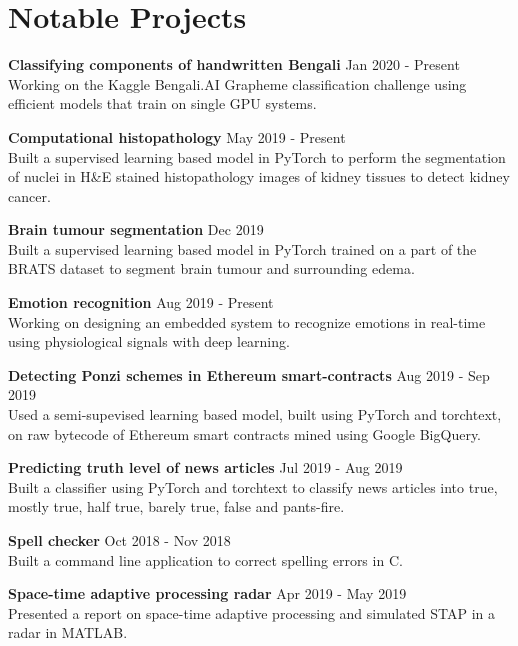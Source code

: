 \documentclass[letterpaper]{article}
\renewenvironment{itemize}{
  \begin{list}{}{
    \setlength{\leftmargin}{1.5em}
  }
}{
  \end{list}
}
\newcommand{\datefont}[1]{\textcolor{black!80}{\small{#1}}}
\begin{document}
\section*{Notable Projects}
  \begin{itemize}
    \item
    \textbf{Classifying components of handwritten Bengali}
    \hfill{\datefont{Jan 2020 - Present}}\\
    Working on the Kaggle Bengali.AI Grapheme classification challenge
    using efficient models that train on single GPU systems.

    \item
    \textbf{Computational histopathology}
    \hfill{\datefont{May 2019 - Present}}\\
    Built a supervised learning based model in PyTorch to perform the segmentation of nuclei in H\&E stained histopathology images of kidney tissues to detect kidney cancer.

    \item
    \textbf{Brain tumour segmentation}
    \hfill{\datefont{Dec 2019}}\\
    Built a supervised learning based model in PyTorch trained on a part of the BRATS dataset to segment brain tumour and surrounding edema.

    \item
    \textbf{Emotion recognition}
    \hfill{\datefont{Aug 2019 - Present}}\\
    Working on designing an embedded system to recognize emotions in real-time using physiological signals with deep learning.

    \item
    \textbf{Detecting Ponzi schemes in Ethereum smart-contracts}
    \hfill{\datefont{Aug 2019 - Sep 2019}}\\
    Used a semi-supevised learning based model, built using PyTorch and torchtext, on raw bytecode of Ethereum smart contracts mined using Google BigQuery.

    \item
    \textbf{Predicting truth level of news articles}
    \hfill{\datefont{Jul 2019 - Aug 2019}}\\
    Built a classifier using PyTorch and torchtext to classify news articles into true, mostly true, half true, barely true, false and pants-fire.

    \item
    \textbf{Spell checker}
    \hfill{\datefont{Oct 2018 - Nov 2018}}\\
    Built a command line application to correct spelling errors in C.

    \item
    \textbf{Space-time adaptive processing radar}
    \hfill{\datefont{Apr 2019 - May 2019}}\\
    Presented a report on space-time adaptive processing and simulated STAP in a radar in MATLAB.

  \end{itemize}
\end{document}
